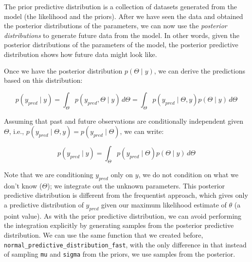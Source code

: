 \documentclass[12pt,]{krantz}
\newenvironment{Shaded}{\begin{snugshade}}{\end{snugshade}}
\newcommand{\KeywordTok}[1]{\textcolor[rgb]{0.13,0.29,0.53}{\textbf{#1}}}
\newcommand{\DataTypeTok}[1]{\textcolor[rgb]{0.13,0.29,0.53}{#1}}
\newcommand{\StringTok}[1]{\textcolor[rgb]{0.31,0.60,0.02}{#1}}
\newcommand{\OperatorTok}[1]{\textcolor[rgb]{0.81,0.36,0.00}{\textbf{#1}}}
\newcommand{\NormalTok}[1]{#1}
\theoremstyle{definition}
\theoremstyle{definition}
\theoremstyle{definition}
\theoremstyle{remark}
\begin{document}
The prior predictive distribution is a collection of datasets generated
from the model (the likelihood and the priors). After we have seen the
data and obtained the posterior distributions of the parameters, we can
now use the \emph{posterior distributions} to generate future data from
the model. In other words, given the posterior distributions of the
parameters of the model, the posterior predictive distribution shows how
future data might look like.

Once we have the posterior distribution \(p(\Theta\mid y)\), we can
derive the predictions based on this distribution:

\begin{equation}
p(y_{pred}\mid y ) = \int_\Theta p(y_{pred}, \Theta\mid y)\, d\Theta= \int_\Theta 
p(y_{pred}\mid \Theta,y)p(\Theta\mid y)\, d\Theta
\end{equation}

Assuming that past and future observations are conditionally independent
given \(\Theta\), i.e.,
\(p(y_{pred}\mid \Theta,y)= p(y_{pred}\mid \Theta)\), we can write:

\begin{equation}
p(y_{pred}\mid y )=\int_\Theta p(y_{pred}\mid \Theta) p(\Theta\mid y)\, d\Theta
\label{eq:postpp}
\end{equation}

Note that we are conditioning \(y_{pred}\) only on \(y\), we do not
condition on what we don't know (\(\Theta\)); we integrate out the
unknown parameters. This posterior predictive distribution is different
from the frequentist approach, which gives only a predictive
distribution of \(y_{pred}\) given our maximum likelihood estimate of
\(\theta\) (a point value). As with the prior predictive distribution,
we can avoid performing the integration explicitly by generating samples
from the posterior predictive distribution. We can use the same function
that we created before, \texttt{normal\_predictive\_distribution\_fast},
with the only difference in that instead of sampling \texttt{mu} and
\texttt{sigma} from the priors, we use samples from the posterior.

\begin{Shaded}
\end{Shaded}
\end{document}
